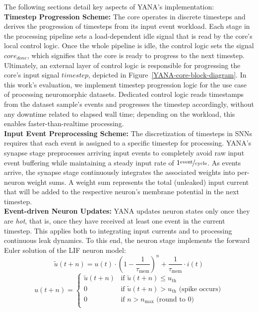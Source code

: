 \noindent The following sections detail key aspects of YANA's implementation:
\\
\textbf{Timestep Progression Scheme:}
The core operates in discrete timesteps and derives the progression of timesteps from its input event workload. Each stage in the processing pipeline sets a load-dependent idle signal that is read by the core's local control logic. Once the whole pipeline is idle, the control logic sets the signal $core_{done}$, which signifies that the core is ready to progress to the next timestep.
Ultimately, an external layer of control logic is responsible for progressing the core's input signal $timestep$, depicted in Figure~\ref{YANA-core-block-diagram}.
In this work's evaluation, we implement timestep progression logic for the use case of processing neuromorphic datasets. Dedicated control logic reads timestamps from the dataset sample's events and progresses the timestep 
accordingly, without any downtime related to elapsed wall time; depending on the workload, this enables faster-than-realtime processing.
\\
\textbf{Input Event Preprocessing Scheme:}
The discretization of timesteps in \acp{SNN} requires that each event is assigned to a specific timestep for processing. YANA's synapse stage preprocesses arriving
input events to completely avoid raw input event buffering while maintaining a steady input rate of $1\nicefrac{\text{event}}{\text{cycle}}$. As events arrive, the synapse stage continuously integrates the associated weights into per-neuron weight sums. A weight sum represents the total (unleaked) input current that will be added to the respective neuron's membrane potential in
the next timestep.
\\
\textbf{Event-driven Neuron Updates:}
YANA updates neuron states only once they are \textit{hot}, that is, once they have received at least one event in the current timestep. This applies both to integrating input currents and to processing continuous leak dynamics. To this end, the neuron stage implements the forward Euler solution of the \ac{LIF} neuron model:
\begin{equation}
  \label{eq:lif_update}
  \tilde{u}(t+n) = u(t) \cdot \left(1 - \frac{1}{\tau_{\text{mem}}}\right)^n + \frac{1}{\tau_{\text{mem}}} \cdot i(t)
\end{equation}
\begin{equation}
  \label{eq:lif_spike_condition}
  u(t+n) = \begin{cases}
    \tilde{u}(t+n) & \text{if } \tilde{u}(t+n) \leq u_{\text{th}} \\
    0 & \text{if } \tilde{u}(t+n) > u_{\text{th}} \text{ (spike occurs)} \\
    0 & \text{if } n > n_{\text{max}} \text{ (round to 0)} \\
  \end{cases}
\end{equation}
